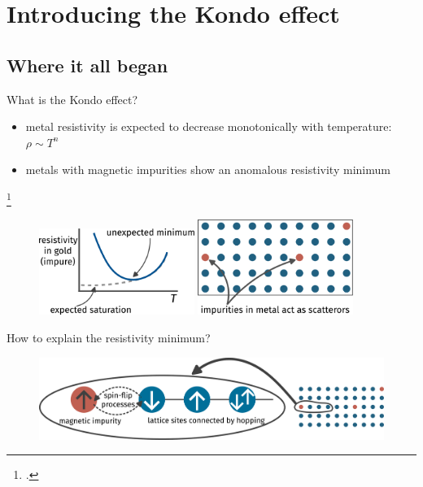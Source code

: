\documentclass[aspectratio=169]{beamer}
\begin{document}
\section{Introducing the Kondo effect}
\subsection{Where it all began}

\begin{frame}{What is the Kondo effect?}
\begin{itemize}
	\item metal resistivity is expected to decrease monotonically with temperature: \(\rho \sim T^n\)
	\item metals with magnetic impurities show an anomalous resistivity minimum
\end{itemize}

\footcite{deHaas1939}
	\begin{figure}[htpb]
		\centering
		\includegraphics[width=0.45\textwidth]{resistance_minimum.pdf}
		\hspace*{\fill}
		\includegraphics[width=0.45\textwidth]{metal_impurity.pdf}
	\end{figure}
\end{frame}

\begin{frame}{How to explain the resistivity minimum?}
	\begin{figure}[htpb]
		\centering
		\includegraphics[width=\textwidth]{KondoModel.pdf}
	\end{figure}
\end{frame}
\end{document}

